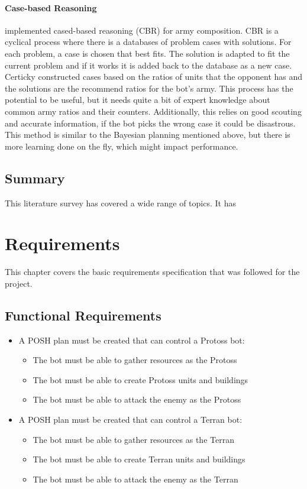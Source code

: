 \documentclass[11pt,openright,a4paper]{report}
\begin{document}
\subsubsection{Case-based Reasoning}
 implemented cased-based reasoning (CBR) for army composition. CBR is a cyclical process where there is a databases of problem cases with solutions. For each problem, a case is chosen that best fits. The solution is adapted to fit the current problem and if it works it is added back to the database as a new case. Certicky constructed cases based on the ratios of units that the opponent has and the solutions are the recommend ratios for the bot's army. This process has the potential to be useful, but it needs quite a bit of expert knowledge about common army ratios and their counters. Additionally, this relies on good scouting and accurate information, if the bot picks the wrong case it could be disastrous. This method is similar to the Bayesian planning mentioned above, but there is more learning done on the fly, which might impact performance.

\section{Summary}
This literature survey has covered a wide range of topics. It has

\chapter{Requirements}
This chapter covers the basic requirements specification that was followed for the project.

\section{Functional Requirements}
\begin{itemize}
\item A POSH plan must be created that can control a Protoss bot:
    \begin{itemize}
    \item{The bot must be able to gather resources as the Protoss}
    \item{The bot must be able to create Protoss units and buildings}
    \item{The bot must be able to attack the enemy as the Protoss}
    \end{itemize}
\item A POSH plan must be created that can control a Terran bot:
    \begin{itemize}
    \item{The bot must be able to gather resources as the Terran}
    \item{The bot must be able to create Terran units and buildings}
    \item{The bot must be able to attack the enemy as the Terran}
    \end{itemize}
\end{itemize}
\end{document}
